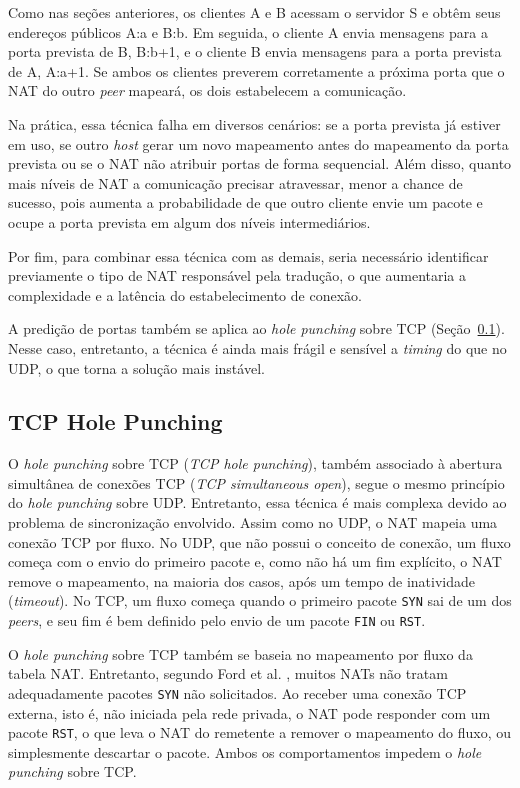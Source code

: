 Como nas seções anteriores, os clientes A e B acessam o servidor S e obtêm seus endereços públicos A:a e B:b. Em seguida, o cliente A envia mensagens para a porta prevista de B, B:b+1, e o cliente B envia mensagens para a porta prevista de A, A:a+1. Se ambos os clientes preverem corretamente a próxima porta que o NAT do outro \textit{peer} mapeará, os dois estabelecem a comunicação.

Na prática, essa técnica falha em diversos cenários: se a porta prevista já estiver em uso, se outro \textit{host} gerar um novo mapeamento antes do mapeamento da porta prevista ou se o NAT não atribuir portas de forma sequencial. Além disso, quanto mais níveis de NAT a comunicação precisar atravessar, menor a chance de sucesso, pois aumenta a probabilidade de que outro cliente envie um pacote e ocupe a porta prevista em algum dos níveis intermediários.

Por fim, para combinar essa técnica com as demais, seria necessário identificar previamente o tipo de NAT responsável pela tradução, o que aumentaria a complexidade e a latência do estabelecimento de conexão.

A predição de portas também se aplica ao \textit{hole punching} sobre TCP (Seção~\ref{sec:tcp_hole_punching}). Nesse caso, entretanto, a técnica é ainda mais frágil e sensível a \textit{timing} do que no UDP, o que torna a solução mais instável.

\subsection{TCP Hole Punching}
\label{sec:tcp_hole_punching}

O \textit{hole punching} sobre TCP (\textit{TCP hole punching}), também associado à abertura simultânea de conexões TCP (\textit{TCP simultaneous open}), segue o mesmo princípio do \textit{hole punching} sobre UDP. Entretanto, essa técnica é mais complexa devido ao problema de sincronização envolvido. Assim como no UDP, o NAT mapeia uma conexão TCP por fluxo. No UDP, que não possui o conceito de conexão, um fluxo começa com o envio do primeiro pacote e, como não há um fim explícito, o NAT remove o mapeamento, na maioria dos casos, após um tempo de inatividade (\textit{timeout}). No TCP, um fluxo começa quando o primeiro pacote \texttt{SYN} sai de um dos \textit{peers}, e seu fim é bem definido pelo envio de um pacote \texttt{FIN} ou \texttt{RST}.

O \textit{hole punching} sobre TCP também se baseia no mapeamento por fluxo da tabela NAT. Entretanto, segundo Ford et al. \citep{ford2005peer}, muitos NATs não tratam adequadamente pacotes \texttt{SYN} não solicitados. Ao receber uma conexão TCP externa, isto é, não iniciada pela rede privada, o NAT pode responder com um pacote \texttt{RST}, o que leva o NAT do remetente a remover o mapeamento do fluxo, ou simplesmente descartar o pacote. Ambos os comportamentos impedem o \textit{hole punching} sobre TCP.

